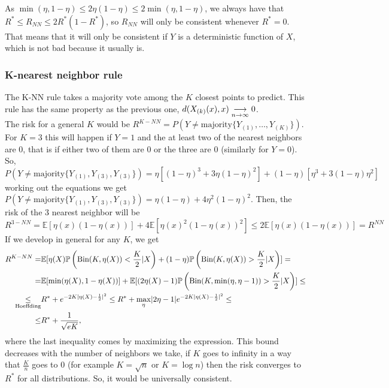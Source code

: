 \documentclass[11pt, english]{article}
\begin{document}
As $\min(\eta,1-\eta)\leq2\eta(1-\eta)\leq 2\min(\eta,1-\eta)$, we always have that $R^*\leq R_{NN}\leq 2R^*(1-R^*)$, so $R_{NN}$ will only be consistent whenever $R^*=0$. That means that it will only be consistent if $Y$ is a deterministic function of $X$, which is not bad because it usually is.\\

\subsubsection{K-nearest neighbor rule}

The K-NN rule takes a majority vote among the $K$ closest points to predict. This rule has the same property as the previous one, $d(X_{(k)}(x),x)\underset{\scriptsize{n\rightarrow \infty}}{\longrightarrow}0$. \\

The risk for a general $K$ would be $R^{K-NN}=P(Y\neq \text{majority}\{Y_{(1)},\dots,Y_{(K)}\})$. For $K=3$ this will happen if $Y=1$ and the at least two of the nearest neighbors are 0, that is if either two of them are 0 or the three are 0 (similarly for $Y=0$). So, $P(Y\neq \text{majority}\{Y_{(1)},Y_{(3)},Y_{(3)}\})=\eta[(1-\eta)^3+3\eta(1-\eta)^2]+(1-\eta)[\eta^3+3(1-\eta)\eta^2]$ working out the equations we get $P(Y\neq \text{majority}\{Y_{(1)},Y_{(3)},Y_{(3)}\})=\eta(1-\eta)+4\eta^2(1-\eta)^2$. Then, the risk of the 3 nearest neighbor will be
\begin{equation}
	R^{3-NN}=\mathbb{E}[\eta(x) (1-\eta(x))]+4\mathbb{E}[\eta(x)^2(1-\eta(x))^2]\leq2\mathbb{E}[\eta(x)(1-\eta(x))]=R^{NN}
\end{equation}
If we develop in general for any $K$, we get
\begin{align}
	R^{K-NN} = &\mathbb{E}[\eta(X)\mathbb{P}\left(\text{Bin}(K,\eta(X))<\frac{K}{2}|X\right)+(1-\eta)\mathbb{P}\left(\text{Bin}(K,\eta(X))>\frac{K}{2}|X\right)]=\\
	= & \mathbb{E}[\min(\eta(X),1-\eta(X))]+\mathbb{E}[(2\eta(X)-1)\mathbb{P}\left(\text{Bin}(K,\min(\eta,\eta-1))>\frac{K}{2}|X\right)]\leq\\
	\underset{\scriptsize{\text{Hoeffding}}}{\leq} & R^*+e^{-2K|\eta(X)-\frac{1}{2}|^2}\leq R^*+\underset{\eta}{\max}|2\eta-1|e^{-2K|\eta(X)-\frac{1}{2}|^2}\leq\\
	\leq & R^*+\frac{1}{\sqrt{eK}},
\end{align}
where the last inequality comes by maximizing the expression. This bound decreases with the number of neighbors we take, if $K$ goes to infinity in a way that $\frac{K}{n}$ goes to 0 (for example $K=\sqrt{n}$ or $K=\log n$) then the risk converges to $R^*$ for all distributions. So, it would be universally consistent. \\
\end{document}
